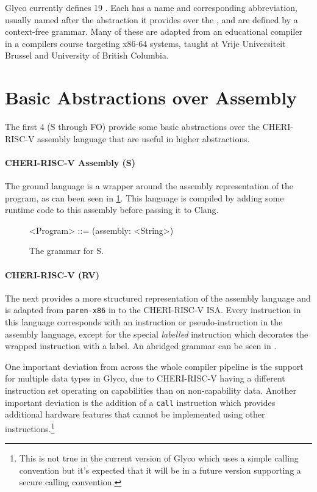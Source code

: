 \documentclass[main.tex]{subfiles}
\begin{document}
Glyco currently defines 19 \ils{}. Each \il{} has a name and corresponding abbreviation, usually named after the abstraction it provides over the \lowerlang{}, and are defined by a context-free grammar. Many of these \ils{} are adapted from an educational compiler in a compilers course targeting x86-64 systems, taught at Vrije Universiteit Brussel \cite{:compcourse} and University of British Columbia.

\section{Basic Abstractions over Assembly}

The first 4 \ils{} (S through FO) provide some basic abstractions over the CHERI-RISC-V assembly language that are useful in higher abstractions.

\paragraph{CHERI-RISC-V Assembly (S)} The ground language is a wrapper around the assembly representation of the program, as can been seen in \cref{bnf:s}. This language is compiled by adding some runtime code to this assembly before passing it to Clang.
\begin{figure}[ht]
	\begin{grammar}
		<Program> ::= (assembly: <String>)
	\end{grammar}
	\caption{The grammar for S.}
	\label{bnf:s}
\end{figure}

\paragraph{CHERI-RISC-V (RV)} The next \il{} provides a more structured representation of the assembly language and is adapted from \texttt{paren-x86} in \cite{:compcourse} to the CHERI-RISC-V ISA. Every instruction in this language corresponds with an instruction or pseudo-instruction in the assembly language, except for the special \emph{labelled} instruction which decorates the wrapped instruction with a label. An abridged grammar can be seen in .

One important deviation from \cite{:compcourse} across the whole compiler pipeline is the support for multiple data types in Glyco, due to CHERI-RISC-V having a different instruction set operating on capabilities than on non-capability data. Another important deviation is the addition of a \texttt{call} instruction which provides additional hardware features that cannot be implemented using other instructions.\footnote{This is not true in the current version of Glyco which uses a simple calling convention but it's expected that it will be in a future version supporting a secure calling convention.}
\end{document}

